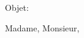 \documentclass[11pt]{letter} %
\begin{document}

\begin{letter}{} 
\date{}%


\signature{Santiago Bragagnolo} %


Objet: 

\opening{Madame, Monsieur,} 
 


\end{letter}
\end{document}
